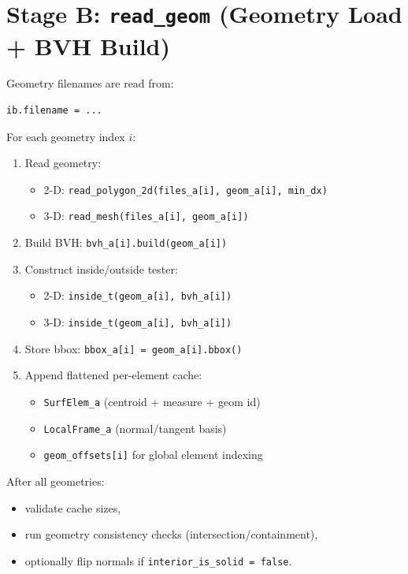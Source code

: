 \documentclass[11pt,a4paper]{article}
\begin{document}
\section{Stage B: \texttt{read\_geom} (Geometry Load + BVH Build)}

Geometry filenames are read from:
\begin{verbatim}
ib.filename = ...
\end{verbatim}

For each geometry index \(i\):
\begin{enumerate}[nosep]
  \item Read geometry:
  \begin{itemize}[nosep]
    \item 2-D: \texttt{read\_polygon\_2d(files\_a[i], geom\_a[i], min\_dx)}
    \item 3-D: \texttt{read\_mesh(files\_a[i], geom\_a[i])}
  \end{itemize}
  \item Build BVH: \texttt{bvh\_a[i].build(geom\_a[i])}
  \item Construct inside/outside tester:
  \begin{itemize}[nosep]
    \item 2-D: \texttt{inside\_t(geom\_a[i], bvh\_a[i])}
    \item 3-D: \texttt{inside\_t(geom\_a[i], bvh\_a[i])}
  \end{itemize}
  \item Store bbox: \texttt{bbox\_a[i] = geom\_a[i].bbox()}
  \item Append flattened per-element cache:
  \begin{itemize}[nosep]
    \item \texttt{SurfElem\_a} (centroid + measure + geom id)
    \item \texttt{LocalFrame\_a} (normal/tangent basis)
    \item \texttt{geom\_offsets[i]} for global element indexing
  \end{itemize}
\end{enumerate}

After all geometries:
\begin{itemize}[nosep]
  \item validate cache sizes,
  \item run geometry consistency checks (intersection/containment),
  \item optionally flip normals if \texttt{interior\_is\_solid = false}.
\end{itemize}
\end{document}
